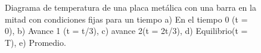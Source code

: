 \documentclass{article}
\begin{document}
\begin{figure}[H]
    \caption{Diagrama de temperatura de una placa metálica con una barra en la mitad con condiciones fijas para un tiempo a) En el tiempo 0 (t = 0), b) Avance 1 (t = t/3), c) avance 2(t = 2t/3), d) Equilibrio(t = T), e) Promedio.}
    \label{fig:CondicionesFijasTemp}
\end{figure}
\end{document}
